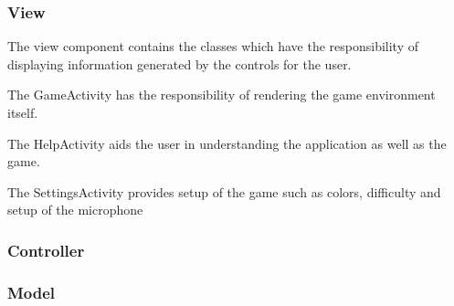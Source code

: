 \subsubsection{View}
The view component contains the classes which have the responsibility of displaying information generated by the controls for the user.

The GameActivity has the responsibility of rendering the game environment itself. 

The HelpActivity aids the user in understanding the application as well as the game. 

The SettingsActivity provides setup of the game such as colors, difficulty and setup of the microphone

\subsubsection{Controller}

\subsubsection{Model}
